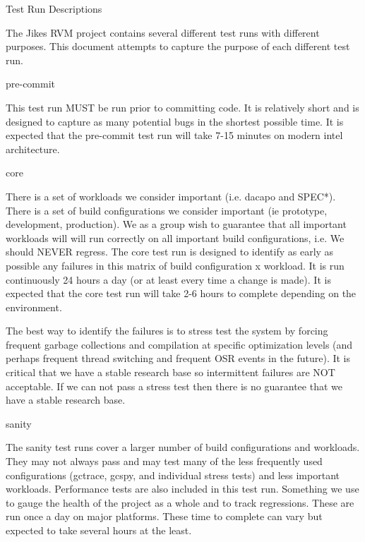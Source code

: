 \begin{section}{Test Run Descriptions}
\label{sec:testrundescriptions}

The Jikes RVM project contains several different test runs with different purposes. This document attempts to capture the purpose of each different test run.

\begin{subsection}{pre-commit}

This test run MUST be run prior to committing code. It is relatively short and is designed to capture as many potential bugs in the shortest possible time. It is expected that the pre-commit test run will take 7-15 minutes on modern intel architecture.

\end{subsection}

\begin{subsection}{core}

There is a set of workloads we consider important (i.e. dacapo and SPEC*). There is a set of build configurations we consider important (ie prototype, development, production). We as a group wish to guarantee that all important workloads will will run correctly on all important build configurations, i.e. We should NEVER regress. The core test run is designed to identify as early as possible any failures in this matrix of build configuration x workload. It is run continuously 24 hours a day (or at least every time a change is made). It is expected that the core test run will take 2-6 hours to complete depending on the environment.

The best way to identify the failures is to stress test the system by forcing frequent garbage collections and compilation at specific optimization levels (and perhaps frequent thread switching and frequent OSR events in the future). It is critical that we have a stable research base so intermittent failures are NOT acceptable. If we can not pass a stress test then there is no guarantee that we have a stable research base.

\end{subsection}

\begin{subsection}{sanity}

The sanity test runs cover a larger number of build configurations and workloads. They may not always pass and may test many of the less frequently used configurations (gctrace, gcspy, and individual stress tests) and less important workloads. Performance tests are also included in this test run. Something we use to gauge the health of the project as a whole and to track regressions. These are run once a day on major platforms. These time to complete can vary but expected to take several hours at the least.


\end{subsection}
\end{section}
